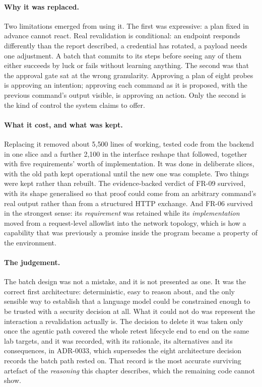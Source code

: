 \paragraph{Why it was replaced.} Two limitations emerged from using it. The first
was expressive: a plan fixed in advance cannot react. Real revalidation is
conditional: an endpoint responds differently than the report described, a
credential has rotated, a payload needs one adjustment. A batch that
commits to its steps before seeing any of them either succeeds by luck or fails
without learning anything. The second was that the approval gate sat at the wrong
granularity. Approving a plan of eight probes is approving an intention;
approving each command as it is proposed, with the previous command's output
visible, is approving an action. Only the second is the kind of control the
system claims to offer.

\paragraph{What it cost, and what was kept.} Replacing it removed about
5{,}500 lines of working, tested code from the backend in one slice and a further
2{,}100 in the interface reshape that followed, together with five requirements'
worth of implementation. It was done in deliberate slices, with the old path kept
operational until the new one was complete. Two things were kept rather than
rebuilt. The evidence-backed verdict of FR-09 survived, with its shape
generalised so that proof could come from an arbitrary command's real output
rather than from a structured HTTP exchange. And FR-06 survived in the strongest
sense: its \emph{requirement} was retained while its \emph{implementation} moved
from a request-level allowlist into the network topology, which is how a
capability that was previously a promise inside the program became a property of
the environment.

\paragraph{The judgement.} The batch design was not a mistake, and it is not
presented as one. It was the correct first architecture: deterministic, easy to
reason about, and the only sensible way to establish that a language model could
be constrained enough to be trusted with a security decision at all. What it
could not do was represent the interaction a revalidation actually is. The
decision to delete it was taken only once the agentic path covered the whole
retest lifecycle end to end on the same lab targets, and it was recorded, with
its rationale, its alternatives and its consequences, in ADR-0033, which
supersedes the eight architecture decision records the batch path rested on. That
record is the most accurate surviving artefact of the \emph{reasoning} this chapter
describes, which the remaining code cannot show.
